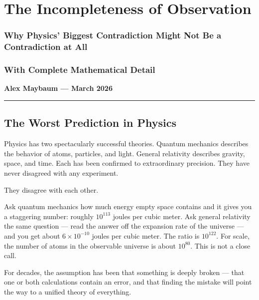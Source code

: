 \documentclass[
]{article}
\author{}
\date{}
\begin{document}
\hypertarget{the-incompleteness-of-observation}{%
\section{The Incompleteness of
Observation}\label{the-incompleteness-of-observation}}

\hypertarget{why-physics-biggest-contradiction-might-not-be-a-contradiction-at-all}{%
\subsubsection{Why Physics' Biggest Contradiction Might Not Be a
Contradiction at
All}\label{why-physics-biggest-contradiction-might-not-be-a-contradiction-at-all}}

\hypertarget{with-complete-mathematical-detail}{%
\subsubsection{With Complete Mathematical
Detail}\label{with-complete-mathematical-detail}}

\textbf{Alex Maybaum --- March 2026}

\begin{center}\rule{0.5\linewidth}{0.5pt}\end{center}

\hypertarget{the-worst-prediction-in-physics}{%
\subsection{The Worst Prediction in
Physics}\label{the-worst-prediction-in-physics}}

Physics has two spectacularly successful theories. Quantum mechanics
describes the behavior of atoms, particles, and light. General
relativity describes gravity, space, and time. Each has been confirmed
to extraordinary precision. They have never disagreed with any
experiment.

They disagree with each other.

Ask quantum mechanics how much energy empty space contains and it gives
you a staggering number: roughly \(10^{113}\) joules per cubic meter.
Ask general relativity the same question --- read the answer off the
expansion rate of the universe --- and you get about
\(6 \times 10^{-10}\) joules per cubic meter. The ratio is \(10^{122}\).
For scale, the number of atoms in the observable universe is about
\(10^{80}\). This is not a close call.

For decades, the assumption has been that something is deeply broken ---
that one or both calculations contain an error, and that finding the
mistake will point the way to a unified theory of everything.
\end{document}
